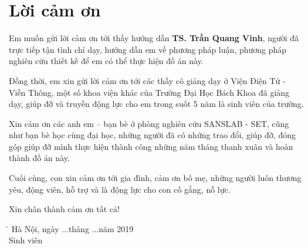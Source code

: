 \thispagestyle{plain}
\chapter*{Lời cảm ơn}

Em muốn gửi lời cảm ơn tới thầy hướng dẫn \textbf{TS. Trần Quang Vinh}, người đã trực tiếp tận tình chỉ dạy, hướng dẫn em về phương pháp luận, phương pháp nghiên cứu thiết kế để em có thể thực hiện đồ án này.\par
	Đồng thời, em xin gửi lời cảm ơn tới các thầy cô giảng dạy ở Viện Điện Tử - Viễn Thông, một số khoa viện khác của Trường Đại Học Bách Khoa đã giảng dạy, giúp đỡ và truyền động lực cho em trong suốt 5 năm là sinh viên của trường. \par
	Xin cảm ơn các anh em – bạn bè ở phòng nghiên cứu SANSLAB - SET, cũng như bạn bè học cùng đại học, những người đã có những trao đổi, giúp đỡ, đóng góp giúp đỡ mình thực hiện thành công những năm tháng thanh xuân và hoàn thành đồ án này. \par
	Cuối cùng, con xin cảm ơn tới gia đình, cảm ơn bố mẹ, những người luôn thương yêu, động viên, hỗ trợ và là động lực cho con cố gắng, nỗ lực.  \par

Xin chân thành cảm ơn tất cả! \par

           

 
  \begin{tabbing}
 \hspace{8.5cm}\=\kill
   \> Hà Nội, ngày ...tháng ...năm 2019 \\ 
   \>  \hspace{2cm}    Sinh viên\\ 
 \end{tabbing}